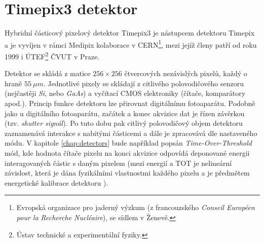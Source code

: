 \section{Timepix3 detektor}
Hybridní částicový pixelový detektor Timepix3 \cite{timepix3} je nástupcem detektoru Timepix \cite{timepix} a je vyvíjen v rámci Medipix kolaborace v CERN\footnote{Evropská organizace pro jaderný výzkum (z francouzského \textit{Conseil Européen pour la Recherche Nucléaire}), se sídlem v Ženevě.}, mezi jejíž členy patří od roku 1999 i ÚTEF\footnote{Ústav technické a experimentální fyziky.} ČVUT v Praze.

Detektor se skládá z matice $256\times256$ čtvercových nezávislých pixelů, každý o hraně $55~\mu m$. 
Jednotlivé pixely se skládají z citlivého polovodičového senzoru (nejčastěji \textit{Si}, nebo \textit{GaAs}) a vyčítací CMOS elektroniky (čítače, komparátory apod.). Princip funkce detektoru lze přirovnat digitálnímu fotoaparátu. Podobně jako u digitálního fotoaparátu, začátek a konec akvizice dat je řízen závěrkou (tzv. \textit{shutter signál}). Po tuto dobu pak citlivý polovodičový objem detektoru zaznamenává interakce s nabitými částicemi a dále je zpracovává dle nastaveného módu. V kapitole \ref{chap:detectors} bude například popsán \textit{Time-Over-Threshold} mód, kde hodnota čítače pixelu na konci akvizice odpovídá deponované energii interagovaných částic s daným pixelem (mezi energií a TOT je nelineární závislost, která je dána fyzikálními vlastnostmi každého pixelu a je předmětem energetické kalibrace detektoru \cite{Jakubek2011S262}). 

